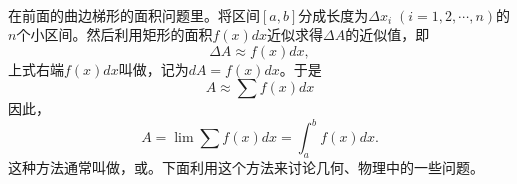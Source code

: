 \paragraph{}
在前面的曲边梯形的面积问题里。将区间$[a,b]$分成长度为$\Delta x_i \; (i=1,2,\cdots,n)$的$n$个小区间。然后利用矩形的面积$f(x)dx$近似求得$\Delta A$的近似值，即
\begin{equation*}
  \Delta A \approx f(x)dx,
\end{equation*}
上式右端$f(x)dx$叫做，记为$dA=f(x)dx$。于是
\begin{equation*}
  A \approx \sum f(x)dx
\end{equation*}
因此，
\begin{equation*}
  A = \lim\sum f(x)dx = \int_a^bf(x)dx.
\end{equation*}
这种方法通常叫做，或。下面利用这个方法来讨论几何、物理中的一些问题。
